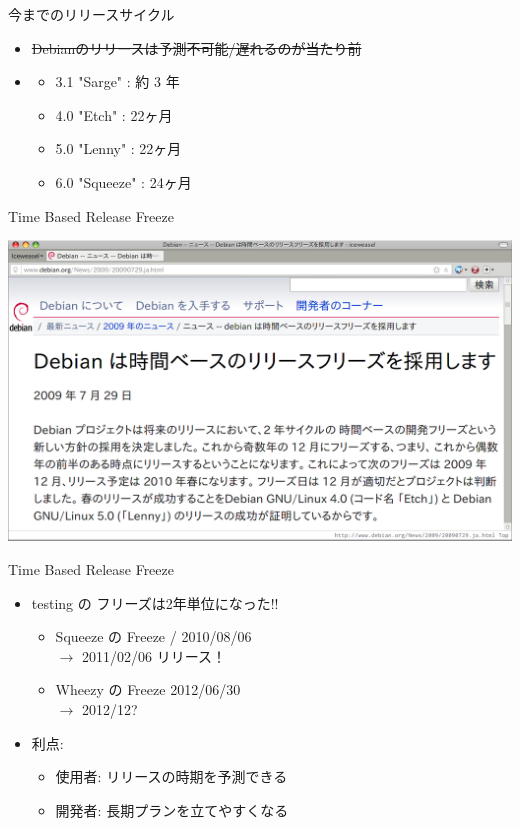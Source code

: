 \begin{frame}{今までのリリースサイクル}

\begin{itemize}
\item \sout{Debianのリリースは予測不可能/遅れるのが当たり前}
\item \color{red}{Etch から ほぼ 2 年毎のリリース}
\begin{itemize}
  \item 3.1 "Sarge"   : 約 3 年
  \item 4.0 "Etch"    : 22ヶ月
  \item 5.0 "Lenny"   : 22ヶ月
  \item 6.0 "Squeeze" : 24ヶ月
\end{itemize}
\end{itemize}

\end{frame}

\begin{frame}{Time Based Release Freeze}

\begin{center}
\includegraphics[width=1\hsize]{image201208/Debian_News_2009-07-29-TimeBasedReleaseFreeze.png}
\end{center}

\end{frame}

\begin{frame}{Time Based Release Freeze}

\begin{itemize}
\item testing の フリーズは2年単位になった!!
  \begin{itemize}
    \item Squeeze の Freeze / 2010/08/06 \\$\rightarrow$ 2011/02/06 リリース！
    \item Wheezy の Freeze 2012/06/30 \\$\rightarrow$ 2012/12?
  \end{itemize}
\item 利点:
  \begin{itemize}
    \item 使用者: リリースの時期を予測できる
    \item 開発者: 長期プランを立てやすくなる
  \end{itemize}
\end{itemize}

\end{frame}

